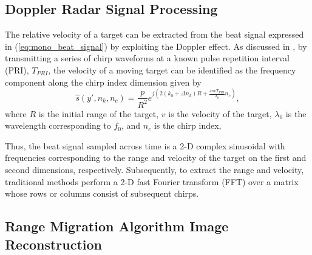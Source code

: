 \documentclass[10pt,journal,final]{IEEEtran}
\begin{document}

\subsection{Doppler Radar Signal Processing}
\label{subsec:fmcw_doppler_radar}
The relative velocity of a target can be extracted from the beat signal expressed in (\ref{eq:mono_beat_signal}) by exploiting the Doppler effect.
As discussed in \cite{fmcw:range_doppler}, by transmitting a series of chirp waveforms at a known pulse repetition interval (PRI), $T_{PRI}$, the velocity of a moving target can be identified as the frequency component along the chirp index dimension given by
\begin{equation}
	\label{eq:doppler_final}
	\hat{s}(y',n_k,n_c) = \frac{p}{R^2} e^{j(2(k_0 + \Delta n_k)R + \frac{4\pi v T_{PRI}}{\lambda_0}n_c)},
\end{equation}
where $R$ is the initial range of the target, $v$ is the velocity of the target, $\lambda_0$ is the wavelength corresponding to $f_0$, and $n_c$ is the chirp index,

Thus, the beat signal sampled across time is a 2-D complex sinusoidal with frequencies corresponding to the range and velocity of the target on the first and second dimensions, respectively. Subsequently, to extract the range and velocity, traditional methods perform a 2-D fast Fourier transform (FFT) over a matrix whose rows or columns consist of subsequent chirps. 

\subsection{Range Migration Algorithm Image Reconstruction}
\label{subsec:rma}

\end{document}
